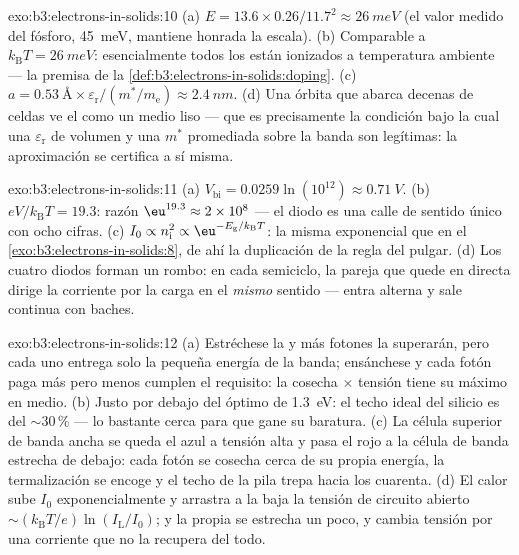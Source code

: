\begin{solution}{exo:b3:electrons-in-solids:10}
(a) $E = 13.6\times0.26/11.7^2 \approx \qty{26}{meV}$ (el
valor medido del fósforo, \qty{45}{meV}, mantiene honrada la
escala). (b) Comparable a $k_{\text{B}}T = \qty{26}{meV}$:
esencialmente todos los  están ionizados a temperatura ambiente --- la
premisa de la \cref{def:b3:electrons-in-solids:doping}. (c) $a =
\qty{0.53}{\angstrom}\times\varepsilon_{\text{r}}/(m^*/
m_{\text{e}}) \approx \qty{2.4}{nm}$. (d) Una órbita que abarca
decenas de celdas ve el  como un medio liso --- que es
precisamente la condición bajo la cual una $\varepsilon_{\text{r}}$
de volumen y una $m^*$ promediada sobre la banda son legítimas:
la aproximación se certifica a sí misma.
\end{solution}

\begin{solution}{exo:b3:electrons-in-solids:11}
(a) $V_{\text{bi}} = 0.0259\ln(10^{12}) \approx \qty{0.71}{V}$.
(b) $eV/k_{\text{B}}T = 19.3$: razón $\eu^{19.3} \approx
2\times10^{8}$ --- el diodo es una calle de sentido único con ocho
cifras. (c) $I_0 \propto n_{\text{i}}^2 \propto
\eu^{-E_{\text{g}}/k_{\text{B}}T}$: la misma exponencial que en el
\cref{exo:b3:electrons-in-solids:8}, de ahí la
duplicación de la regla del pulgar. (d) Los cuatro diodos forman un rombo: en cada
semiciclo, la pareja que quede en directa dirige la corriente
por la carga en el \emph{mismo} sentido --- entra alterna y sale continua
con baches.
\end{solution}

\begin{solution}{exo:b3:electrons-in-solids:12}
(a) Estréchese la  y más fotones la superarán, pero cada uno entrega
solo la pequeña energía de la banda; ensánchese y cada fotón paga más
pero menos cumplen el requisito: la cosecha $\times$ tensión tiene su máximo en medio.
(b) Justo por debajo del óptimo de \qty{1.3}{eV}: el techo ideal del
silicio es del $\sim30\,\%$ --- lo bastante cerca para que gane su baratura.
(c) La célula superior de banda ancha se queda el azul a tensión alta y pasa
el rojo a la célula de banda estrecha de debajo: cada fotón se cosecha
cerca de su propia energía, la termalización se encoge y el techo de la
pila trepa hacia los cuarenta. (d) El calor sube $I_0$
exponencialmente y arrastra a la baja la tensión de circuito abierto
$\sim(k_{\text{B}}T/e)\ln(I_{\text{L}}/I_0)$; y la propia 
se estrecha un poco, y cambia tensión por una corriente que no la
recupera del todo.
\end{solution}

